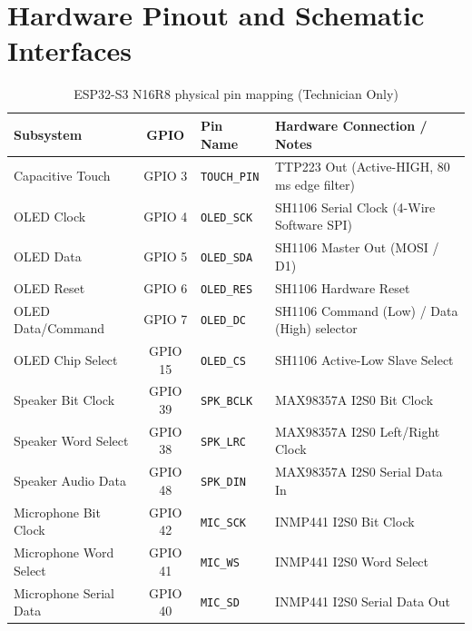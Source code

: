 \documentclass[11pt,a4paper,oneside]{report}
\newcommand{\hdr}[1]{\cellcolor{LightBlue}\textbf{#1}}
\begin{document}
\chapter{Hardware Pinout and Schematic Interfaces}
\begin{table}[H]\centering\small
\caption{ESP32-S3 N16R8 physical pin mapping (Technician Only)}
\begin{tabularx}{\linewidth}{|l|c|l|X|}\hline
\hdr{Subsystem} & \hdr{GPIO} & \hdr{Pin Name} & \hdr{Hardware Connection / Notes}\\ \hline
Capacitive Touch & GPIO 3 & \texttt{TOUCH\_PIN} & TTP223 Out (Active-HIGH, 80\,ms edge filter) \\ \hline
OLED Clock & GPIO 4 & \texttt{OLED\_SCK} & SH1106 Serial Clock (4-Wire Software SPI) \\ \hline
OLED Data & GPIO 5 & \texttt{OLED\_SDA} & SH1106 Master Out (MOSI / D1) \\ \hline
OLED Reset & GPIO 6 & \texttt{OLED\_RES} & SH1106 Hardware Reset \\ \hline
OLED Data/Command & GPIO 7 & \texttt{OLED\_DC} & SH1106 Command (Low) / Data (High) selector \\ \hline
OLED Chip Select & GPIO 15 & \texttt{OLED\_CS} & SH1106 Active-Low Slave Select \\ \hline
Speaker Bit Clock & GPIO 39 & \texttt{SPK\_BCLK} & MAX98357A I2S0 Bit Clock \\ \hline
Speaker Word Select & GPIO 38 & \texttt{SPK\_LRC} & MAX98357A I2S0 Left/Right Clock \\ \hline
Speaker Audio Data & GPIO 48 & \texttt{SPK\_DIN} & MAX98357A I2S0 Serial Data In \\ \hline
Microphone Bit Clock & GPIO 42 & \texttt{MIC\_SCK} & INMP441 I2S0 Bit Clock \\ \hline
Microphone Word Select & GPIO 41 & \texttt{MIC\_WS} & INMP441 I2S0 Word Select \\ \hline
Microphone Serial Data & GPIO 40 & \texttt{MIC\_SD} & INMP441 I2S0 Serial Data Out \\ \hline
\end{tabularx}
\end{table}
\end{document}
